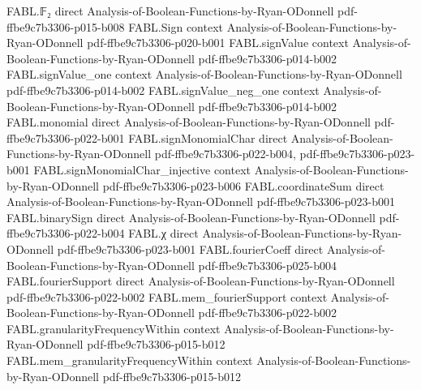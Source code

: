 \begin{theorem}
\label{FABL.finiteAddFourierCoeff_affineSubspaceRestriction_zero_eq_expect}
\leanok
{}
\proofstep
  {FABL.𝔽₂}
  {direct}
  {Analysis-of-Boolean-Functions-by-Ryan-ODonnell}
  {pdf-ffbe9c7b3306-p015-b008}
\proofstep
  {FABL.Sign}
  {context}
  {Analysis-of-Boolean-Functions-by-Ryan-ODonnell}
  {pdf-ffbe9c7b3306-p020-b001}
\proofstep
  {FABL.signValue}
  {context}
  {Analysis-of-Boolean-Functions-by-Ryan-ODonnell}
  {pdf-ffbe9c7b3306-p014-b002}
\proofstep
  {FABL.signValue_one}
  {context}
  {Analysis-of-Boolean-Functions-by-Ryan-ODonnell}
  {pdf-ffbe9c7b3306-p014-b002}
\proofstep
  {FABL.signValue_neg_one}
  {context}
  {Analysis-of-Boolean-Functions-by-Ryan-ODonnell}
  {pdf-ffbe9c7b3306-p014-b002}
\proofstep
  {FABL.monomial}
  {direct}
  {Analysis-of-Boolean-Functions-by-Ryan-ODonnell}
  {pdf-ffbe9c7b3306-p022-b001}
\proofstep
  {FABL.signMonomialChar}
  {direct}
  {Analysis-of-Boolean-Functions-by-Ryan-ODonnell}
  {pdf-ffbe9c7b3306-p022-b004,
    pdf-ffbe9c7b3306-p023-b001}
\proofstep
  {FABL.signMonomialChar_injective}
  {context}
  {Analysis-of-Boolean-Functions-by-Ryan-ODonnell}
  {pdf-ffbe9c7b3306-p023-b006}
\proofstep
  {FABL.coordinateSum}
  {direct}
  {Analysis-of-Boolean-Functions-by-Ryan-ODonnell}
  {pdf-ffbe9c7b3306-p023-b001}
\proofstep
  {FABL.binarySign}
  {direct}
  {Analysis-of-Boolean-Functions-by-Ryan-ODonnell}
  {pdf-ffbe9c7b3306-p022-b004}
\proofstep
  {FABL.χ}
  {direct}
  {Analysis-of-Boolean-Functions-by-Ryan-ODonnell}
  {pdf-ffbe9c7b3306-p023-b001}
\proofstep
  {FABL.fourierCoeff}
  {direct}
  {Analysis-of-Boolean-Functions-by-Ryan-ODonnell}
  {pdf-ffbe9c7b3306-p025-b004}
\proofstep
  {FABL.fourierSupport}
  {direct}
  {Analysis-of-Boolean-Functions-by-Ryan-ODonnell}
  {pdf-ffbe9c7b3306-p022-b002}
\proofstep
  {FABL.mem_fourierSupport}
  {context}
  {Analysis-of-Boolean-Functions-by-Ryan-ODonnell}
  {pdf-ffbe9c7b3306-p022-b002}
\proofstep
  {FABL.granularityFrequencyWithin}
  {context}
  {Analysis-of-Boolean-Functions-by-Ryan-ODonnell}
  {pdf-ffbe9c7b3306-p015-b012}
\proofstep
  {FABL.mem_granularityFrequencyWithin}
  {context}
  {Analysis-of-Boolean-Functions-by-Ryan-ODonnell}
  {pdf-ffbe9c7b3306-p015-b012}
\proofstep

\end{theorem}
